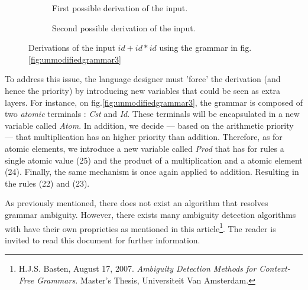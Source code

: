 \documentclass[a4paper,11pt]{article}
\begin{document}
  \begin{figure}[h!]
\centering
\begin{subfigure}[b]{0.4\textwidth}
\caption{First possible derivation of the input.}
\label{fig:ambiguoustree1}
\end{subfigure}
\hfill
\begin{subfigure}[b]{0.4\textwidth}
\caption{Second possible derivation of the input.}
\label{fig:ambiguoustree2}
\end{subfigure}
\caption{Derivations of the input $id+id*id$ using the grammar in fig.\ref{fig:unmodifiedgrammar3}}
\end{figure}
  To address this issue, the language designer must 'force' the derivation (and hence the priority) by introducing new variables that could be seen as extra layers. For instance, on fig.\ref{fig:unmodifiedgrammar3}, the grammar is composed of two \textit{atomic} terminals : \textit{Cst} and \textit{Id}. These terminals will be encapsulated in a new variable called \textit{Atom}. In addition, we decide --- based on the arithmetic priority --- that multiplication has an higher priority than addition. Therefore, as for atomic elements, we introduce a new variable called \textit{Prod} that has for rules a single atomic value (25) and the product of a multiplication and a atomic element (24). Finally, the same mechanism is once again applied to addition. Resulting in the rules (22) and (23).\\
  \begin{tcolorbox}
    As previously mentioned, there does not exist an algorithm that resolves grammar ambiguity. However, there exists many ambiguity detection algorithms with have their own proprieties as mentioned in this article\footnote{H.J.S. Basten, August 17, 2007. \textit{Ambiguity Detection Methods for Context-Free Grammars.} Master's Thesis, Universiteit Van Amsterdam.}. The reader is invited to read this document for further information.
  \end{tcolorbox}
\end{document}
